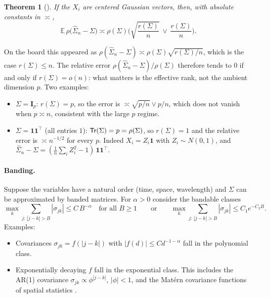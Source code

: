 \documentclass[11pt]{article}
\newtheorem{thm}{Theorem}
\def\bk#1{{\mathbf #1}}
\newcommand{\wh}{\widehat}
\newcommand{\Expect}{\mathbb{E}}
\newcommand{\Tr}{\mathop{\sf Tr}}
\begin{document}
\begin{thm}[\citet{KL17}]\label{thm:kl}
If the $X_i$ are centered Gaussian vectors, then, with absolute constants in $\asymp$,
\[
\Expect\,\rho\big(\wh\Sigma_n-\Sigma\big)\asymp\rho(\Sigma)\Big(\sqrt{\frac{r(\Sigma)}n}\ \vee\ \frac{r(\Sigma)}n\Big).
\]
\end{thm}

On the board this appeared as $\rho(\wh\Sigma_n-\Sigma)\asymp\rho(\Sigma)\sqrt{r(\Sigma)/n}$, which is the case $r(\Sigma)\le n$. The relative error $\rho(\wh\Sigma_n-\Sigma)/\rho(\Sigma)$ therefore tends to $0$ if and only if $r(\Sigma)=o(n)$: what matters is the effective rank, not the ambient dimension $p$. Two examples:
\begin{itemize}
\item $\Sigma=\bk I_p$: $r(\Sigma)=p$, so the error is $\asymp\sqrt{p/n}\vee p/n$, which does not vanish when $p\asymp n$, consistent with the large $p$ regime.
\item $\Sigma=\mathbf 1\mathbf 1^\top$ (all entries $1$): $\Tr(\Sigma)=p=\rho(\Sigma)$, so $r(\Sigma)=1$ and the relative error is $\asymp n^{-1/2}$ for every $p$. Indeed $X_i=Z_i\mathbf 1$ with $Z_i\sim N(0,1)$, and $\wh\Sigma_n-\Sigma=(\frac1n\sum_iZ_i^2-1)\,\mathbf 1\mathbf 1^\top$.
\end{itemize}

\paragraph{Banding.}
Suppose the variables have a natural order (time, space, wavelength) and $\Sigma$ can be approximated by banded matrices. For $\alpha>0$ consider the bandable classes
\begin{equation}\label{eq:bandable}
\max_k\sum_{j:\,|j-k|>B}|\sigma_{jk}|\le C\,B^{-\alpha}\quad\text{for all }B\ge1
\qquad\text{or}\qquad
\max_k\sum_{j:\,|j-k|>B}|\sigma_{jk}|\le C_1e^{-C_2B}.
\end{equation}
Examples:
\begin{itemize}
\item Covariances $\sigma_{jk}=f(|j-k|)$ with $|f(d)|\le Cd^{-1-\alpha}$ fall in the polynomial class.
\item Exponentially decaying $f$ fall in the exponential class. This includes the AR(1) covariance $\sigma_{jk}\propto\phi^{|j-k|}$, $|\phi|<1$, and the Matérn covariance functions of spatial statistics \citep{Ste99}.
\end{itemize}
\end{document}
